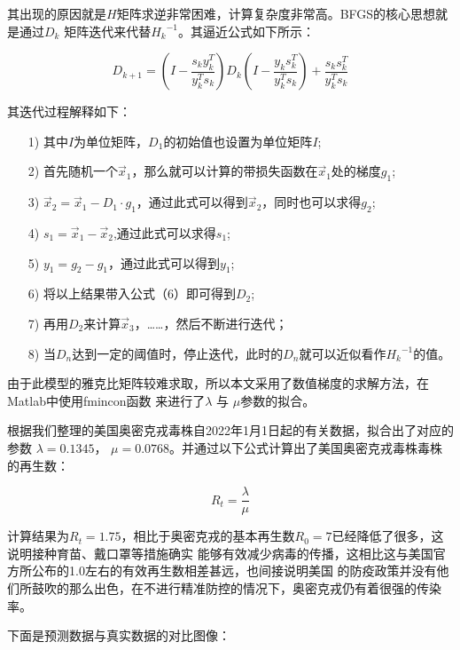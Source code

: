 \documentclass[bwprint]{gmcmthesis}
\numberwithin{figure}{section}
\begin{document}
\par 其出现的原因就是$H$矩阵求逆非常困难，计算复杂度非常高。BFGS的核心思想就是通过$D_k$
矩阵迭代来代替${H_k}^{-1}$。其逼近公式如下所示：

\begin{equation} \label{}
    D_{k+1}=\left( I-\frac{s_ky_{k}^{T}}{y_{k}^{T}s_k} \right) D_k\left( I-\dfrac{y_ks_{k}^{T}}{y_{k}^{T}s_k} \right) +\dfrac{s_ks_{k}^{T}}{y_{k}^{T}s_k}
\end{equation}

\par 其迭代过程解释如下：

\begin{itemize}
    \item[1)] 其中$I$为单位矩阵，$D_1$的初始值也设置为单位矩阵$I$;
    \item[2)] 首先随机一个$\vec{x}_1$，那么就可以计算的带损失函数在$\vec{x}_1$处的梯度$g_1$;
    \item[3)] $\vec{x}_2=\vec{x}_1-D_1\cdot g_1$，通过此式可以得到$\vec{x}_2$，同时也可以求得$g_2$;
    \item[4)] $s_1=\vec{x}_1-\vec{x}_2$,通过此式可以求得$s_1$;
    \item[5)] $y_1=g_2-g_1$，通过此式可以得到$y_1$;
    \item[6)] 将以上结果带入公式（6）即可得到$D_2$;
    \item[7)] 再用$D_2$来计算$\vec{x}_3$，……，然后不断进行迭代；
    \item[8)] 当$D_n$达到一定的阈值时，停止迭代，此时的$D_n$就可以近似看作${H_k}^{-1}$的值。
\end{itemize}

\par 由于此模型的雅克比矩阵较难求取，所以本文采用了数值梯度的求解方法，在Matlab中使用fmincon函数
来进行了$\lambda$ 与 $\mu$参数的拟合。

\par 根据我们整理的美国奥密克戎毒株自2022年1月1日起的有关数据，拟合出了对应的参数
$\lambda = 0.1345$， $\mu = 0.0768$。并通过以下公式计算出了美国奥密克戎毒株毒株的再生数：

\begin{equation}
    R_t=\dfrac{\lambda}{\mu}
\end{equation}

\par 计算结果为$R_t=1.75$，相比于奥密克戎的基本再生数$R_0=7$已经降低了很多，这说明接种育苗、戴口罩等措施确实
能够有效减少病毒的传播，这相比这与美国官方所公布的1.0左右的有效再生数相差甚远，也间接说明美国
的防疫政策并没有他们所鼓吹的那么出色，在不进行精准防控的情况下，奥密克戎仍有着很强的传染率。
\par 下面是预测数据与真实数据的对比图像：
\end{document}
